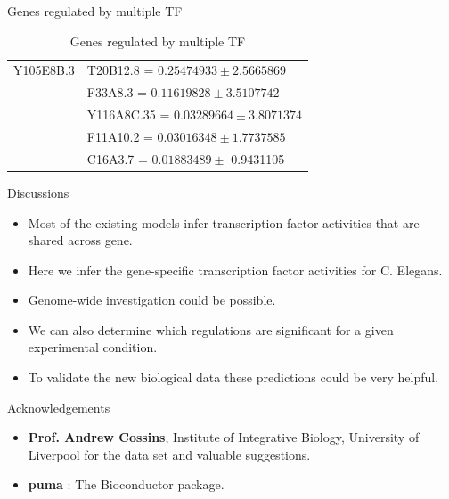 \documentclass[serif,mathserif,final]{beamer}
\begin{document}
\begin{frame}{}
\begin{columns}[t]
\begin{column}{0.24\linewidth}
\begin{block}{Genes regulated by multiple TF}
\begin{table}
\begin{tabular}{l l }
	      {\color{red} Y105E8B.3} & {\color{blue} T20B12.8 } = $ 0.25474933 \pm  2.5665869 $ \\
		  			& {\color{blue} F33A8.3 } = $ 0.11619828  \pm  3.5107742 $ \\
 		  			& {\color{blue} Y116A8C.35 } = $ 0.03289664 \pm  3.8071374 $ \\
					& {\color{blue} F11A10.2 } = $ 0.03016348 \pm 1.7737585 $ \\
 		  			& {\color{blue} C16A3.7  } = $ 0.01883489 \pm  $ 0.9431105\\

	  \end{tabular}
	  \caption{Genes regulated by multiple TF}
	  \end{table}
       
       \end{block}

       
      \begin{block}{Discussions}
	  \begin{itemize}
	  \item Most of the existing models infer transcription factor activities that are shared across gene. 
	  \item Here we infer the gene-specific transcription factor activities for C. Elegans. 
	  \item Genome-wide investigation could be possible.
	  \item We can also determine which regulations are significant for a given experimental condition.
	  \item To validate the new biological data these predictions could be very helpful.
	  \end{itemize}

      \end{block}

      \begin{block}{Acknowledgements}

      \begin{itemize}
      \item {\bf Prof. Andrew Cossins}, Institute of Integrative Biology, University of Liverpool for the data set and valuable suggestions. \\

      \item {\bf puma} : The Bioconductor package. \\


\end{itemize}
\end{block}
\end{column}
\end{columns}
\end{frame}
\end{document}
